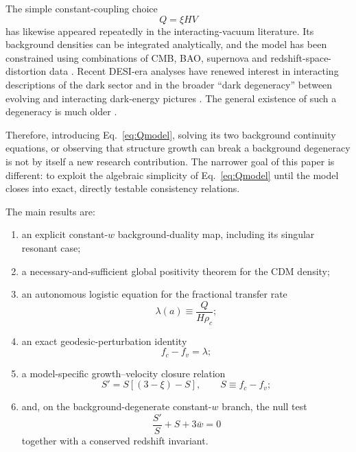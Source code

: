 \documentclass[11pt]{article}
\theoremstyle{remark}
\begin{document}
The simple constant-coupling choice
\begin{equation}
    Q=\xi H V
    \label{eq:Qmodel}
\end{equation}
has likewise appeared repeatedly in the interacting-vacuum literature.  Its background densities can be integrated analytically, and the model has been constrained using combinations of CMB, BAO, supernova and redshift-space-distortion data \cite{Martinelli2019,Yang2021,Kaeonikhom2023}.  Recent DESI-era analyses have renewed interest in interacting descriptions of the dark sector and in the broader ``dark degeneracy'' between evolving and interacting dark-energy pictures \cite{Petri2026,Pan2026}.  The general existence of such a degeneracy is much older \cite{Kunz2009,Aviles2011,vonMarttens2020}.

Therefore, introducing Eq.~\eqref{eq:Qmodel}, solving its two background continuity equations, or observing that structure growth can break a background degeneracy is not by itself a new research contribution.  The narrower goal of this paper is different: to exploit the algebraic simplicity of Eq.~\eqref{eq:Qmodel} until the model closes into exact, directly testable consistency relations.

The main results are:
\begin{enumerate}[leftmargin=2em]
    \item an explicit constant-$w$ background-duality map, including its singular resonant case;
    \item a necessary-and-sufficient global positivity theorem for the CDM density;
    \item an autonomous logistic equation for the fractional transfer rate
    \begin{equation}
        \lambda(a)\equiv\frac{Q}{H\rho_c};
    \end{equation}
    \item an exact geodesic-perturbation identity
    \begin{equation}
        f_c-f_v=\lambda;
    \end{equation}
    \item a model-specific growth--velocity closure relation
    \begin{equation}
        S'=S[(3-\xi)-S],
        \qquad S\equiv f_c-f_v;
        \label{eq:introclosure}
    \end{equation}
    \item and, on the background-degenerate constant-$w$ branch, the null test
    \begin{equation}
        \boxed{\frac{S'}{S}+S+3\bar w=0}
        \label{eq:intronull}
    \end{equation}
    together with a conserved redshift invariant.
\end{enumerate}
\end{document}
